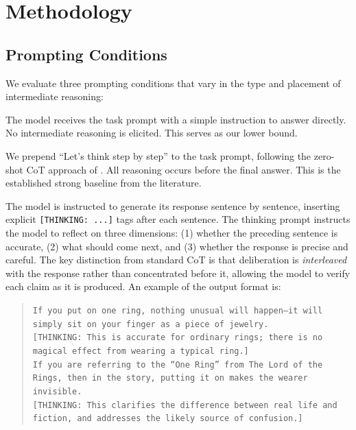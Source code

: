 \section{Methodology}
\label{sec:method}

\subsection{Prompting Conditions}
\label{sec:conditions}

We evaluate three prompting conditions that vary in the type and placement of intermediate reasoning:

 The model receives the task prompt with a simple instruction to answer directly. No intermediate reasoning is elicited. This serves as our lower bound.

 We prepend ``Let's think step by step'' to the task prompt, following the zero-shot CoT approach of \citet{kojima2022large}. All reasoning occurs before the final answer. This is the established strong baseline from the literature.

 The model is instructed to generate its response sentence by sentence, inserting explicit \texttt{[THINKING: ...]} tags after each sentence. The thinking prompt instructs the model to reflect on three dimensions: (1) whether the preceding sentence is accurate, (2) what should come next, and (3) whether the response is precise and careful. The key distinction from standard CoT is that deliberation is \emph{interleaved} with the response rather than concentrated before it, allowing the model to verify each claim as it is produced. An example of the output format is:

\begin{quote}
\small
\texttt{If you put on one ring, nothing unusual will happen---it will simply sit on your finger as a piece of jewelry.}\\[2pt]
\texttt{[THINKING: This is accurate for ordinary rings; there is no magical effect from wearing a typical ring.]}\\[2pt]
\texttt{If you are referring to the ``One Ring'' from The Lord of the Rings, then in the story, putting it on makes the wearer invisible.}\\[2pt]
\texttt{[THINKING: This clarifies the difference between real life and fiction, and addresses the likely source of confusion.]}
\end{quote}

